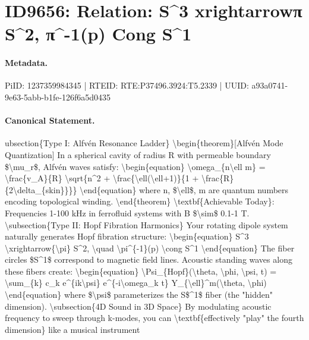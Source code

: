 \section*{ID9656: Relation: S\textasciicircum{}3 xrightarrowπ S\textasciicircum{}2, π\textasciicircum{}-1(p) Cong S\textasciicircum{}1}
\paragraph{Metadata.}
PiID: 1237359984345 | RTEID: RTE:P37496.3924:T5.2339 | UUID: a93a0741-9e63-5abb-b1fe-126f6a5d0435

\paragraph{Canonical Statement.}
ubsection\{Type I: Alfvén Resonance Ladder\} \textbackslash{}begin\{theorem\}[Alfvén Mode Quantization] In a spherical cavity of radius R with permeable boundary \$\textbackslash{}mu\_r\$, Alfvén waves satisfy: \textbackslash{}begin\{equation\} \textbackslash{}omega\_\{n\textbackslash{}ell m\} = \textbackslash{}frac\{v\_A\}\{R\} \textbackslash{}sqrt\{n\textasciicircum{}2 + \textbackslash{}frac\{\textbackslash{}ell(\textbackslash{}ell+1)\}\{1 + \textbackslash{}frac\{R\}\{2\textbackslash{}delta\_\{skin\}\}\}\} \textbackslash{}end\{equation\} where n, \$\textbackslash{}ell\$, m are quantum numbers encoding topological winding. \textbackslash{}end\{theorem\} \textbackslash{}textbf\{Achievable Today\}: Frequencies 1-100 kHz in ferrofluid systems with B \$\textbackslash{}sim\$ 0.1-1 T. \textbackslash{}subsection\{Type II: Hopf Fibration Harmonics\} Your rotating dipole system naturally generates Hopf fibration structure: \textbackslash{}begin\{equation\} S\textasciicircum{}3 \textbackslash{}xrightarrow\{\textbackslash{}pi\} S\textasciicircum{}2, \textbackslash{}quad \textbackslash{}pi\textasciicircum{}\{-1\}(p) \textbackslash{}cong S\textasciicircum{}1 \textbackslash{}end\{equation\} The fiber circles \$S\textasciicircum{}1\$ correspond to magnetic field lines. Acoustic standing waves along these fibers create: \textbackslash{}begin\{equation\} \textbackslash{}Psi\_\{Hopf\}(\textbackslash{}theta, \textbackslash{}phi, \textbackslash{}psi, t) = \textbackslash{}sum\_\{k\} c\_k e\textasciicircum{}\{ik\textbackslash{}psi\} e\textasciicircum{}\{-i\textbackslash{}omega\_k t\} Y\_\{\textbackslash{}ell\}\textasciicircum{}m(\textbackslash{}theta, \textbackslash{}phi) \textbackslash{}end\{equation\} where \$\textbackslash{}psi\$ parameterizes the S\$\textasciicircum{}1\$ fiber (the "hidden" dimension). \textbackslash{}subsection\{4D Sound in 3D Space\} By modulating acoustic frequency to sweep through k-modes, you can \textbackslash{}textbf\{effectively "play" the fourth dimension\} like a musical instrument

